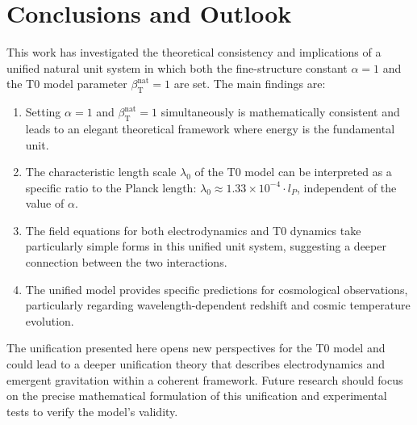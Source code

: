 ﻿\documentclass[12pt,a4paper]{article}
\newcommand{\betaT}{\beta_{\text{T}}}
\begin{document}
	\section{Conclusions and Outlook}
	
	This work has investigated the theoretical consistency and implications of a unified natural unit system in which both the fine-structure constant \(\alpha = 1\) and the T0 model parameter \(\betaT^{\text{nat}} = 1\) are set. The main findings are:
	
	\begin{enumerate}
		\item Setting \(\alpha = 1\) and \(\betaT^{\text{nat}} = 1\) simultaneously is mathematically consistent and leads to an elegant theoretical framework where energy is the fundamental unit.
		\item The characteristic length scale \(\lambda_0\) of the T0 model can be interpreted as a specific ratio to the Planck length: \(\lambda_0 \approx 1.33 \times 10^{-4} \cdot l_P\), independent of the value of \(\alpha\).
		\item The field equations for both electrodynamics and T0 dynamics take particularly simple forms in this unified unit system, suggesting a deeper connection between the two interactions.
		\item The unified model provides specific predictions for cosmological observations, particularly regarding wavelength-dependent redshift and cosmic temperature evolution.
	\end{enumerate}
	
	The unification presented here opens new perspectives for the T0 model and could lead to a deeper unification theory that describes electrodynamics and emergent gravitation within a coherent framework. Future research should focus on the precise mathematical formulation of this unification and experimental tests to verify the model's validity.
	
\end{document}
